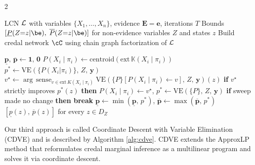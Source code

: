 \documentclass{article}
\newcommand{\kr}[1]{\mathbb{K}\!\left( #1 \right)}
\begin{document}
\begin{algorithm}[t!]
\caption{Coordinate Descend with Variable Elimination (CDVE)}
\label{alg:cdve}
\begin{multicols}{2}
\begin{algorithmic}[1]
\Require LCN $\mathcal{L}$ with variables $\{X_1, \ldots, X_n\}$, evidence $\mathbf{E} = \mathbf{e}$, iterations $T$
\Ensure Bounds $[\underline{P}(Z{=}z|\be),\; \overline{P}(Z{=}z|\be)]$ for
        non-evidence variables $Z$ and states $z$
\Statex
\State Build credal network $\cC$ using chain graph factorization of $\mathcal{L}$

  \State $\underline{\mathbf{p}},\, \overline{\mathbf{p}} \gets \mathbf{1},\, \mathbf{0}$
    \State $P(X_i \mid \pi_i) \gets \mathrm{centroid}(\mathrm{ext}\,\kr{X_i \mid \pi_i})$
    \State $p^* \gets \mathrm{VE}(\{P(X_i|\pi_i)\},\, Z,\, \mathbf{y})$
        \State $v^\star \gets \arg\,\mathrm{sense}_{v \in \mathrm{ext}\,K(X_i \mid \pi_i)}\;
               \mathrm{VE}(\{P\}[P(X_i \mid \pi_i){\gets}v],\, Z,\, \mathbf{y})(z)$
        \Statex \hspace{3em}
        \State \textbf{if} $v^\star$ strictly improves $p^*(z)$
               \textbf{then} $P(X_i \mid \pi_i) \gets v^\star$,\;
               $p^* \gets \mathrm{VE}(\{P\},\, Z,\, \mathbf{y})$
      \EndFor
      \State \textbf{if} sweep made no change \textbf{then break}
    \EndFor
    \State $\underline{\mathbf{p}} \gets \min(\underline{\mathbf{p}},\, p^*)$,\quad
           $\overline{\mathbf{p}} \gets \max(\overline{\mathbf{p}},\, p^*)$
  \EndFor
  \State \Return $[\underline{p}(z),\, \overline{p}(z)]$ for every $z \in D_Z$
\EndFor
\end{algorithmic}
\end{multicols}
\end{algorithm}

Our third approach is called Coordinate Descent with Variable Elimination (CDVE) and is described by Algorithm \ref{alg:cdve}. CDVE extends the ApproxLP method \cite{antonucci2015approxlp} that reformulates credal marginal inference as a multilinear program and solves it via coordinate descent. 
\end{document}
